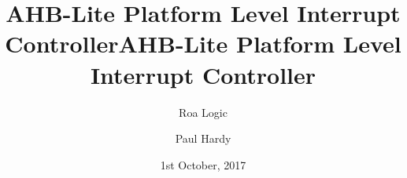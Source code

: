 \graphicspath{ {./img/} }

\title{AHB-Lite Platform Level Interrupt Controller}
\author{Roa Logic}
\date{1st October, 2017}


\title{AHB-Lite Platform Level Interrupt Controller}
\author{Paul Hardy}

\usepackage{fancyhdr}
\pagestyle{fancyplain}
\fancyhf{}
\lfoot{ \fancyplain{}{\today} }
\rfoot{ \fancyplain{}{\thepage} }

